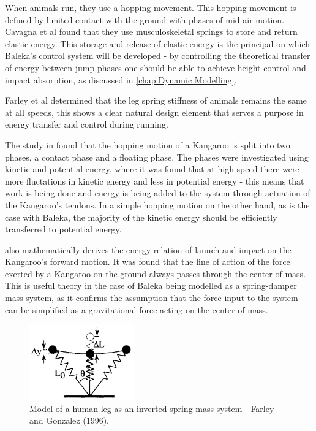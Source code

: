 When animals run, they use a hopping movement. This hopping movement is defined by limited contact with the ground with phases of mid-air motion. Cavagna et al found that they use musculoskeletal springs to store and return elastic energy.\cite{Farley1996} This storage and release of elastic energy is the principal on which Baleka's control system will be developed - by controlling the theoretical transfer of energy between jump phases one should be able to achieve height control and impact absorption, as discussed in \cref{chap:Dynamic Modelling}.

Farley et al determined that the leg spring stiffness of animals remains the same at all speeds, this shows a clear natural design element that serves a purpose in energy transfer and control during running.\cite{Farley1996}

The study in \cite{Alexander2009} found that the hopping motion of a Kangaroo is split into two phases, a contact phase and a floating phase. The phases were investigated using kinetic and potential energy, where it was found that at high speed there were more fluctations in kinetic energy and less in potential energy - this means that work is being done and energy is being added to the system through actuation of the Kangaroo's tendons.\cite{Alexander2009} In a simple hopping motion on the other hand, as is the case with Baleka, the majority of the kinetic energy should be efficiently transferred to potential energy.

\cite{Alexander2009} also mathematically derives the energy relation of launch and impact on the Kangaroo's forward motion. It was found that the line of action of the force exerted by a Kangaroo on the ground always passes through the center of mass.\cite{Alexander2009} This is useful theory in the case of Baleka being modelled as a spring-damper mass system, as it confirms the assumption that the force input to the system can be simplified as a gravitational force acting on the center of mass. 

\begin{figure}
\centering
\includegraphics[width=0.4\textwidth]{images/literature/human-leg-spring-model} 
\caption{Model of a human leg as an inverted spring mass system - Farley and Gonzalez (1996).\cite{Farley1996}}
\label{fig:Model of a human leg}
\end{figure}

